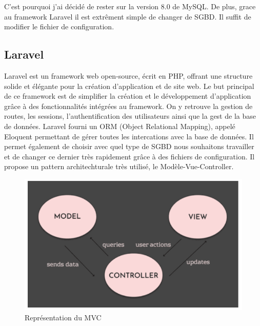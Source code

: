 C'est pourquoi j'ai décidé de rester sur la version 8.0 de MySQL. De plus, grace au framework Laravel il est extrêment simple de changer de SGBD. Il suffit de modifier le fichier de configuration.

\subsection{Laravel}
Laravel est un framework web open-source, écrit en PHP, offrant une structure solide et élégante pour la création d'application et de site web. Le but principal de ce framework est de simplifier la création et le développement d'application grâce à des fonctionnalités intégrées au framework. On y retrouve la gestion de routes, les sessions, l'authentification des utilisateurs ainsi que la gest de la base de données.
Laravel fourni un ORM (Object Relational Mapping), appelé Eloquent permettant de gérer toutes les intercations avec la base de données. Il permet également de choisir avec quel type de SGBD nous souhaitons travailler et de changer ce dernier très rapidement grâce à des fichiers de configuration.
Il propose un pattern architechturale très utilisé, le Modèle-Vue-Controller.
\begin{center}
    \begin{figure}[H]%
        \includegraphics[width=\textwidth]{./assets/figures/MVCExplanation.png}
        \caption{Représentation du MVC \label{MVCExplanation.png}}
    \end{figure}
\end{center}

